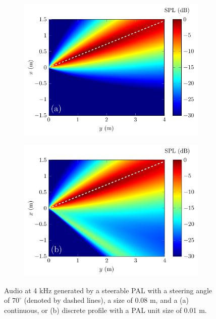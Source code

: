 \begin{figure}[!htb]
    \centering
    \begin{subfigure}{0.49\textwidth}
        \centering
        \includegraphics[width = \textwidth]{fig/Shi2015JasaFig6_FullField_v3_Case1.pdf}
    \end{subfigure}
    \begin{subfigure}{0.49\textwidth}
        \centering
        \includegraphics[width = \textwidth]{fig/Shi2015JasaFig6_FullField_v3_Case2_resize.jpg}
    \end{subfigure}
    \caption{Audio  at 4 kHz generated by a steerable PAL with a steering angle of \ensuremath{70^\circ} (denoted by dashed lines), a size of 0.08 m, and a (a) continuous, or (b) discrete profile with a PAL unit size of 0.01 m. }
    \label{fig:cwe_results_one_beam}
\end{figure}

